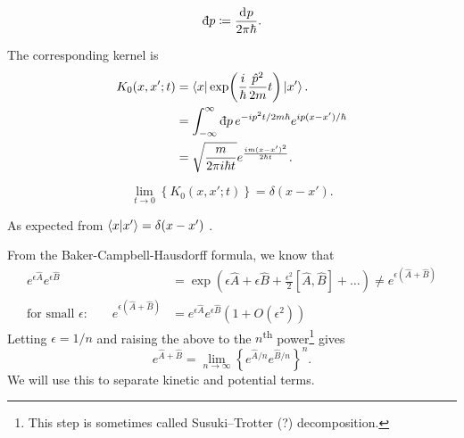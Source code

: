 \begin{definition}[]
  \begin{equation}
    \bdd{p} \coloneqq \frac{\dd[]{p}}{2 \pi \hbar}.
  \end{equation}
\end{definition}

The corresponding kernel is
\begin{align}
  K_0(x, x'; t) &= \bra{x}\exp(\frac{i}{\hbar} \frac{\hat{p}^2}{2m} t) \ket{x'}. \\
		&= \int_{-\infty}^{\infty}\bdd[]{p} e^{-i p^2 t / 2m \hbar} e^{i p (x - x') / \hbar} \\
		&= \sqrt{\frac{m}{2 \pi i \hbar t}} e^{\frac{im (x - x')^2}{2 \hbar t}}. \label{eq:1-kernel}
\end{align}
\begin{remark}
  \begin{equation}
    \lim_{t \to 0} \left\{ K_0(x, x'; t) \right\} = \delta(x - x').
  \end{equation}
\end{remark}
As expected from $\bra{x} \ket{x'} = \delta(x - x')$ .

From the Baker-Campbell-Hausdorff formula, we know that
\begin{align}
  e^{\epsilon \hat{A}} e^{\epsilon \hat{B}} &= \exp(\epsilon \hat{A} + \epsilon \hat{B} + \frac{\epsilon^2}{2} [\hat{A}, \hat{B}] + \dots) \neq e^{\epsilon(\hat{A} + \hat{B})} \\
  \text{for small $\epsilon$:} \qquad e^{\epsilon(\hat{A} + \hat{B})} &= e^{\epsilon \hat{A}} e^{\epsilon \hat{B}} (1 + O(\epsilon^2))
\end{align}
Letting $\epsilon = 1 / n$ and raising the above to the  $n$\textsuperscript{th} power\footnote{This step is sometimes called Susuki--Trotter (?) decomposition.} gives
\begin{equation}
  e^{\hat{A} + \hat{B}} = \lim_{n \to \infty} \left\{ e^{\hat{A} / n} e^{\hat{B} / n} \right\}^n.
\end{equation}
We will use this to separate kinetic and potential terms.

